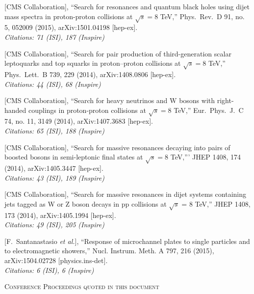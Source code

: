 \documentclass[10pt, a4paper]{article}
\begin{document}
\begin{thebibliography}{599}
  [CMS Collaboration],
  ``Search for resonances and quantum black holes using dijet mass
  spectra in proton-proton collisions at $\sqrt{s}=8$ TeV,''
  Phys.\ Rev.\ D 91, no. 5, 052009 (2015), arXiv:1501.04198 [hep-ex].\\
\emph{Citations: 71 (ISI), 187 (Inspire)}

  [CMS Collaboration],
  ``Search for pair production of third-generation scalar leptoquarks
  and top squarks in proton–proton collisions at $\sqrt{s}=8$ TeV,''
  Phys.\ Lett.\ B 739, 229 (2014), arXiv:1408.0806 [hep-ex].\\
\emph{Citations: 44 (ISI), 68 (Inspire)}

  [CMS Collaboration],
  ``Search for heavy neutrinos and $\mathrm {W}$ bosons with
  right-handed couplings in proton-proton collisions at $\sqrt{s}=8$ TeV,''
  Eur.\ Phys.\ J.\ C 74, no. 11, 3149 (2014), arXiv:1407.3683 [hep-ex].\\
\emph{Citations: 65 (ISI), 188 (Inspire)}

  [CMS Collaboration],
  ``Search for massive resonances decaying into pairs of boosted
  bosons in semi-leptonic final states at $\sqrt{s}=8$ TeV,'''
  JHEP 1408, 174 (2014), arXiv:1405.3447 [hep-ex].\\
\emph{Citations: 43 (ISI), 189 (Inspire)}

 [CMS Collaboration],
  ``Search for massive resonances in dijet systems containing jets
  tagged as W or Z boson decays in pp collisions at $ \sqrt{s} $ = 8 TeV,''
  JHEP 1408, 173 (2014), arXiv:1405.1994 [hep-ex].\\
\emph{Citations: 49 (ISI), 205 (Inspire)}

[F.~Santanastasio {\it et al.}],
  ``Response of microchannel plates to single particles and to electromagnetic showers,''
Nucl. Instrum. Meth. A 797, 216 (2015), arXiv:1504.02728 [physics.ins-det].\\
\emph{Citations: 6 (ISI), 6 (Inspire)}

\vspace{0.1cm} \begin{center} \textsc{Conference Proceedings quoted in
    this document} \end{center} \vspace{0.05cm}


\end{thebibliography}
\end{document}
